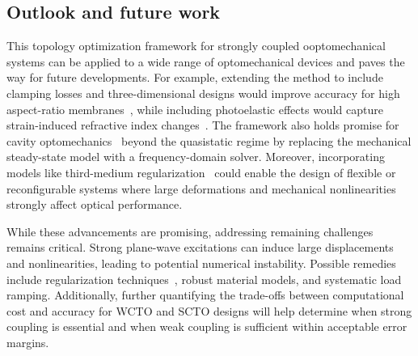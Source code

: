\subsection*{Outlook and future work}
This topology optimization framework for strongly coupled ooptomechanical systems can be applied to a wide
 range of optomechanical devices and paves the way for future developments. 
 For example, extending the method to include clamping losses and three-dimensional designs
  would improve accuracy for high aspect-ratio membranes~\cite{aspect_ratio}, while including
   photoelastic effects would capture strain-induced refractive index changes~\cite{photoelasticity}.
    The framework also holds promise for cavity optomechanics~\cite{cav_opt} beyond the quasistatic
     regime by replacing the mechanical steady-state model with a frequency-domain solver. 
     Moreover, incorporating models like third-medium regularization~\cite{HuHu0} could enable the design of
      flexible or reconfigurable systems where large deformations and mechanical nonlinearities
       strongly affect optical performance.

       While these advancements are promising, addressing remaining challenges remains critical.
       Strong plane-wave excitations can induce large displacements and nonlinearities, 
       leading to potential numerical instability. Possible remedies include regularization techniques~\cite{HuHu0}, 
       robust material models, and systematic load ramping. Additionally, further quantifying the trade-offs between
        computational cost and accuracy for WCTO and SCTO designs will help determine when strong coupling is essential
         and when weak coupling is sufficient within acceptable error margins.
